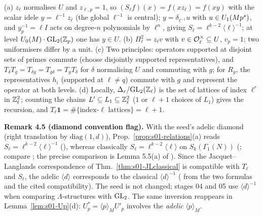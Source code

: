 \begin{outline}
(a) $z_\ell$ normalises $U$ and $z_{\ell,p}=1$, so $(S_\ell f)(x)=f(xz_\ell)=f(xy)$ with the scalar idele $y=\ell^{-1}z_\ell$ (the global
$\ell^{-1}$ is central); $y=\delta_{\ell^{-1}}u$ with $u\in U_1(Mp^s)$, and $y_p^{-1}=\ell I$ acts on degree-$n$ polynomials by $\ell^{n}$,
giving $S_\ell=\ell^{k-2}\langle\ell\rangle^{-1}$; at level $U_0(M)\cdot\mathrm{GL}_2(\mathbb{Z}_p)$ one has $y\in U$. (b) $\Pi_\ell^2=z_\ell v$ with
$v\in\mathcal{O}_\ell^\times\subseteq U$, $v_p=1$; two uniformisers differ by a unit. (c) Two principles: operators supported at disjoint sets of
primes commute (choose disjointly supported representatives), and $T_\delta T_g=T_{\delta g}=T_{g\delta}=T_gT_\delta$ for $\delta$
normalising $U$ and commuting with $g$; for $R_g$, the representatives $h_i$ (supported at $\ell\ne q$) commute with $g$ and represent the
operator at both levels. (d) Locally, $\Delta_r/\mathrm{GL}_2(\mathbb{Z}_\ell)$ is the set of lattices of index $\ell^r$ in $\mathbb{Z}_\ell^2$; counting the
chains $L'\subseteq L_1\subseteq\mathbb{Z}_\ell^2$ ($1$ or $\ell+1$ choices of $L_1$) gives the recursion, and $T_\ell\mathbf 1=\#\{\text{index-}\ell\text{ lattices}\}=\ell+1$.
\end{outline}

\noindent{}\label{rpt:rem:s01-diamond}\textbf{Remark 4.5 (diamond convention flag).}
With the seed's adelic diamond (right translation by $\mathrm{diag}(1,d)$), Prop.~\ref{prop:s01-relations}(a) reads
$S_\ell=\ell^{k-2}\langle\ell\rangle^{-1}$ (\stproved), whereas classically $S_\ell=\ell^{k-2}\langle\ell\rangle$ on $S_k(\Gamma_1(N))$
(\stknown; compare \cite[\S4, p.~13]{Buz04}; the precise comparison is Lemma 5.5(a) of \mainpdf). Since the Jacquet--Langlands
correspondence of Thm.~\ref{thm:s01-JLclassical} is compatible with $T_\ell$ and $S_\ell$, the adelic $\langle d\rangle$ corresponds to the
classical $\langle d\rangle^{-1}$ (\stpmc{} from the two formulas and the cited compatibility). The seed is not changed; stages 04 and 05
use $\langle d\rangle^{-1}$ when comparing $\Lambda$-structures with $\mathrm{GL}_2$. The same inversion reappears in Lemma~\ref{lem:s01-Up}(d):
$U_p^*=\langle p\rangle_MU'_p$ involves the \emph{adelic} $\langle p\rangle_M$.

